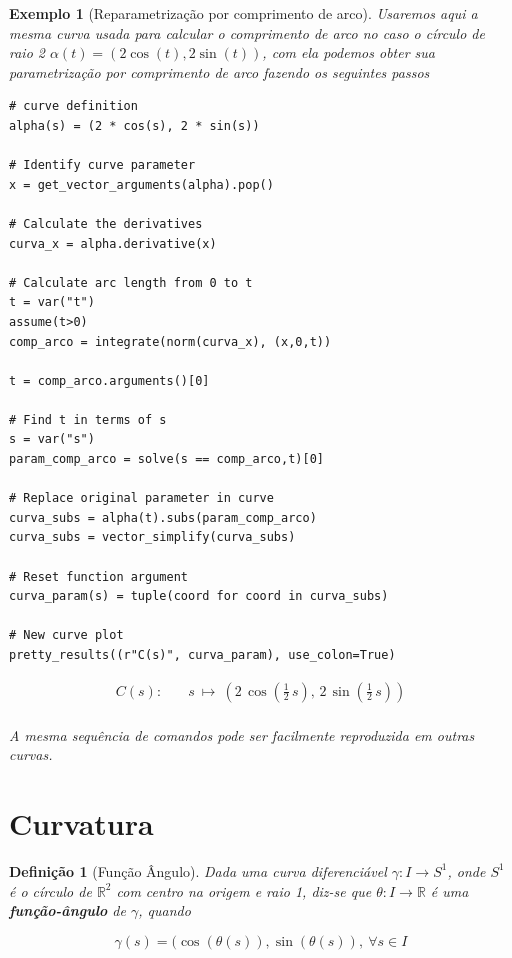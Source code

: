 \documentclass[12pt]{article}
\newtheorem{ex}{Exemplo}[section]
\newtheorem{definition}{Definição}
\begin{document}
\begin{ex}[Reparametrização por comprimento de arco]
Usaremos aqui a mesma curva usada para calcular o comprimento de arco no caso o círculo de raio 2 $\alpha(t) = (2 \cos(t), 2 \sin(t))$, com ela podemos obter sua parametrização por comprimento de arco fazendo os seguintes passos

\begin{lstlisting}
# curve definition
alpha(s) = (2 * cos(s), 2 * sin(s))

# Identify curve parameter
x = get_vector_arguments(alpha).pop()

# Calculate the derivatives
curva_x = alpha.derivative(x)
    
# Calculate arc length from 0 to t
t = var("t")
assume(t>0)
comp_arco = integrate(norm(curva_x), (x,0,t))

t = comp_arco.arguments()[0]
    
# Find t in terms of s
s = var("s")
param_comp_arco = solve(s == comp_arco,t)[0]
    
# Replace original parameter in curve 
curva_subs = alpha(t).subs(param_comp_arco)
curva_subs = vector_simplify(curva_subs)
    
# Reset function argument
curva_param(s) = tuple(coord for coord in curva_subs)

# New curve plot
pretty_results((r"C(s)", curva_param), use_colon=True)
\end{lstlisting}

\newcommand{\Bold}[1]{\mathbf{#1}}\begin{align*} C(s) :& \quad s \ {\mapsto}\ \left(2 \, \cos\left(\frac{1}{2} \, s\right),\,2 \, \sin\left(\frac{1}{2} \, s\right)\right) \\ \end{align*}

A mesma sequência de comandos pode ser facilmente reproduzida em outras curvas. 
\end{ex}

\section{Curvatura}\label{s4}

\begin{definition}[Função Ângulo]
Dada uma curva diferenciável $\gamma: I \rightarrow S^1$, onde $S^1$ é o círculo de $\mathbb{R}^2$ com centro na origem e raio 1, diz-se que $\theta: I \rightarrow \mathbb{R}$ é uma \textbf{função-ângulo} de $\gamma$, quando

$$\gamma(s) = (\cos(\theta(s)), \sin(\theta(s)),\ \forall s \in I$$
\end{definition}
\end{document}
